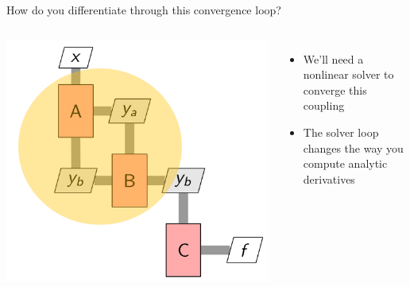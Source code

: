\documentclass[aspectratio=169, usenames,dvipsnames, 14pt]{beamer}
\begin{document}
\begin{frame}{How do you differentiate through this convergence loop? }
\begin{columns}
        \includegraphics[scale=0.2]{images/slide78.png}
        
        \begin{itemize}
            \item We'll need a nonlinear solver to converge this coupling
            \vspace{0.5cm}
            \item The solver loop changes the way you compute analytic derivatives
        \end{itemize}
\end{columns}

\end{frame}
\end{document}
